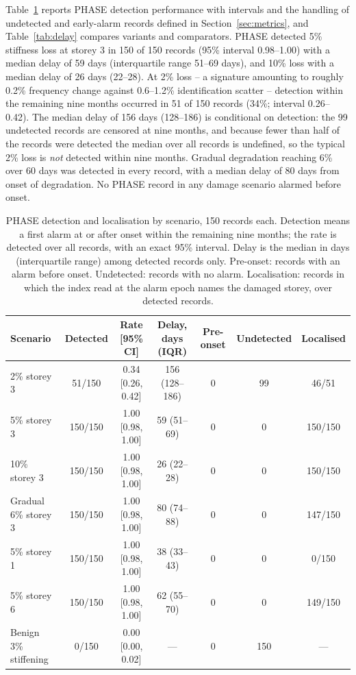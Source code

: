 \documentclass[12pt,a4paper]{article}
\newcommand{\rev}[1]{#1}
\newenvironment{revblock}{}{}
\newcommand{\rev}[1]{{\color{revcol}#1}}
\newenvironment{revblock}{\begingroup\color{revcol}}{\endgroup}
\newcommand{\rtwo}[1]{#1}
\newcommand{\rtwo}[1]{{\color{revcolb}#1}}
\begin{document}
Table~\ref{tab:delaydetail} reports PHASE detection performance with intervals and the handling of undetected and early-alarm records defined in Section~\ref{sec:metrics}, and Table~\ref{tab:delay} compares variants and comparators. \rtwo{PHASE detected 5\% stiffness loss at storey 3 in 150 of 150 records \rtwo{(95\% interval 0.98--1.00)} with a median delay of 59 days (interquartile range 51--69 days), and 10\% loss with a median delay of 26 days (22--28).} At 2\% loss -- a signature amounting to roughly 0.2\% frequency change against 0.6--1.2\% identification scatter -- detection within the remaining nine months occurred in \rev{51 of 150 records (34\%; interval 0.26--0.42). The median delay of 156 days (128--186) is conditional on detection: the 99 undetected records are censored at nine months, and because fewer than half of the records were detected the median over all records is undefined, so the typical 2\% loss is \emph{not} detected within nine months.} Gradual degradation reaching 6\% over 60 days was detected in every record, with a median delay of 80 days from onset of degradation. \rev{No PHASE record in any damage scenario alarmed before onset.}

\begin{table}[t]
\centering
\small
\begin{revblock}
\caption{PHASE detection and localisation by scenario, 150 records each. Detection means a first alarm at or after onset within the remaining nine months; the rate is detected over all records, with an exact 95\% interval. Delay is the median in days (interquartile range) among detected records only. Pre-onset: records with an alarm before onset. Undetected: records with no alarm. Localisation: records in which the index read at the alarm epoch names the damaged storey, over detected records.}
\label{tab:delaydetail}
\setlength{\tabcolsep}{4pt}
\begin{tabular}{lcccccc}
\toprule
Scenario & Detected & Rate [95\% CI] & Delay, days (IQR) & Pre-onset & Undetected & Localised \\
\midrule
2\% storey 3 & 51/150 & 0.34 [0.26, 0.42] & 156 (128--186) & 0 & 99 & 46/51 \\
5\% storey 3 & 150/150 & \rtwo{1.00 [0.98, 1.00]} & 59 (51--69) & 0 & 0 & 150/150  \\
10\% storey 3 & 150/150 & \rtwo{1.00 [0.98, 1.00]} & 26 (22--28) & 0 & 0 & 150/150  \\
Gradual 6\% storey 3 & 150/150 & \rtwo{1.00 [0.98, 1.00]} & 80 (74--88) & 0 & 0 & 147/150  \\
5\% storey 1 & 150/150 & \rtwo{1.00 [0.98, 1.00]} & 38 (33--43) & 0 & 0 & 0/150  \\
5\% storey 6 & 150/150 & \rtwo{1.00 [0.98, 1.00]} & 62 (55--70) & 0 & 0 & 149/150  \\
Benign 3\% stiffening & 0/150 & 0.00 [0.00, 0.02] & --- & 0 & 150 & --- \\
\bottomrule
\end{tabular}
\end{revblock}
\end{table}
\end{document}
